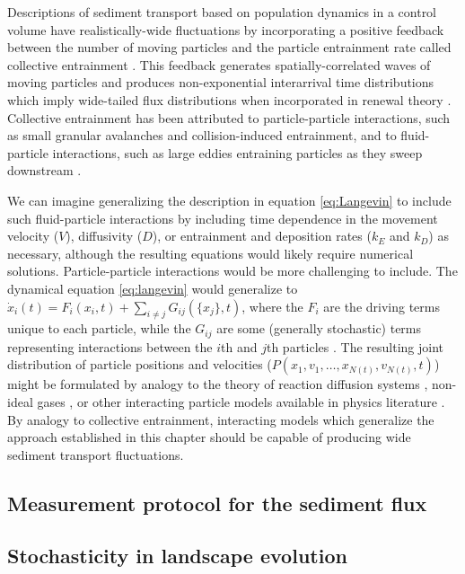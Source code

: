 Descriptions of sediment transport based on population dynamics in a control volume have realistically-wide fluctuations by incorporating a positive feedback between the number of moving particles and the particle entrainment rate called collective entrainment \citep{Ancey2008,Ancey2014}.
This feedback generates spatially-correlated waves of moving particles \citep{Ancey2014, Heyman2015} and produces non-exponential interarrival time distributions \citep{Heyman2013} which imply wide-tailed flux distributions when incorporated in renewal theory \citep{Turowski2010,Ancey2020}.
Collective entrainment has been attributed to particle-particle interactions, such as small granular avalanches and collision-induced entrainment, and to fluid-particle interactions, such as large eddies entraining particles as they sweep downstream \citep{Heyman2014b,Ancey2014,Lee2018}.

We can imagine generalizing the description in equation \ref{eq:Langevin} to include such fluid-particle interactions by including time dependence in the movement velocity ($V$), diffusivity ($D$), or entrainment and deposition rates ($k_E$ and $k_D$) as necessary, although the resulting equations would likely require numerical solutions.
Particle-particle interactions would be more challenging to include.
The dynamical equation \ref{eq:langevin} would generalize to $\dot{x}_i(t) = F_i(x_i,t) + \sum_{i\neq j}G_{ij}(\{x_j\},t)$, where the $F_i$ are the driving terms unique to each particle, while the $G_{ij}$ are some (generally stochastic) terms representing interactions between the $i$th and $j$th particles \citep{Goldstein1956}. The resulting joint distribution of particle positions and velocities ($P(x_1,v_1,\dots,x_{N(t)},v_{N(t)},t)$) might be formulated by analogy to the theory of reaction diffusion systems \citep{Cardy2006}, non-ideal gases \citep{Chapman1970,Brilliantov2004}, or other interacting particle models available in physics literature \citep{Hernandez2004,Escaff2018}. 
By analogy to collective entrainment, interacting models which generalize the approach established in this chapter should be capable of producing wide sediment transport fluctuations.

\subsection{Measurement protocol for the sediment flux}



\subsection{Stochasticity in landscape evolution}

